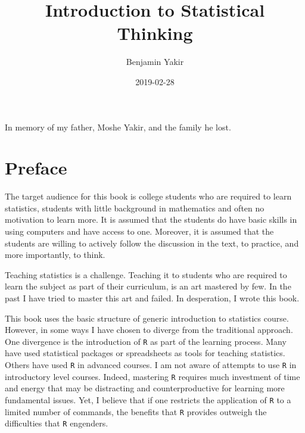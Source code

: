 \documentclass[
]{krantz}
\title{Introduction to Statistical Thinking}
\author{Benjamin Yakir}
\date{2019-02-28}
\theoremstyle{definition}
\theoremstyle{definition}
\theoremstyle{definition}
\theoremstyle{remark}
\begin{document}
\maketitle


\thispagestyle{empty}

\begin{center}
In memory of my father, Moshe Yakir, and the family he lost.
\end{center}

\setlength{\abovedisplayskip}{-5pt}
\setlength{\abovedisplayshortskip}{-5pt}

{
\hypersetup{linkcolor=}
\setcounter{tocdepth}{2}
\tableofcontents
}
\listoftables
\listoffigures
\hypertarget{preface}{%
\chapter*{Preface}\label{preface}}


The target audience for this book is college students who are required
to learn statistics, students with little background in mathematics and
often no motivation to learn more. It is assumed that the students do
have basic skills in using computers and have access to one. Moreover,
it is assumed that the students are willing to actively follow the
discussion in the text, to practice, and more importantly, to think.

Teaching statistics is a challenge. Teaching it to students who are
required to learn the subject as part of their curriculum, is an art
mastered by few. In the past I have tried to master this art and failed.
In desperation, I wrote this book.

This book uses the basic structure of generic introduction to statistics
course. However, in some ways I have chosen to diverge from the
traditional approach. One divergence is the introduction of \texttt{R} as part
of the learning process. Many have used statistical packages or
spreadsheets as tools for teaching statistics. Others have used \texttt{R} in
advanced courses. I am not aware of attempts to use \texttt{R} in introductory
level courses. Indeed, mastering \texttt{R} requires much investment of time
and energy that may be distracting and counterproductive for learning
more fundamental issues. Yet, I believe that if one restricts the
application of \texttt{R} to a limited number of commands, the benefits that
\texttt{R} provides outweigh the difficulties that \texttt{R} engenders.
\end{document}
